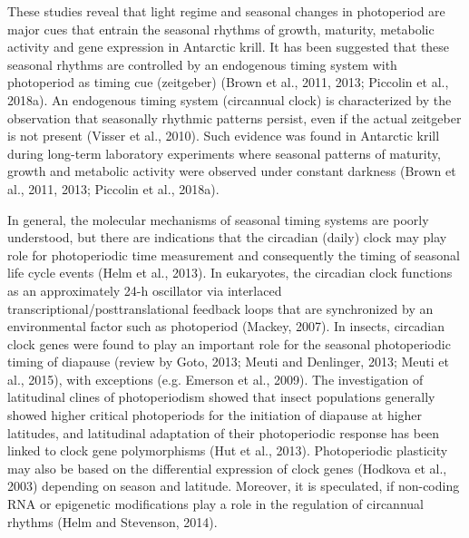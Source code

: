 These studies reveal that light regime and seasonal changes in photoperiod are
major cues that entrain the seasonal rhythms of growth, maturity, metabolic
activity and gene expression in Antarctic krill. It has been suggested that
these seasonal rhythms are controlled by an endogenous timing system with
photoperiod as timing cue (zeitgeber) (Brown et al., 2011, 2013; Piccolin et
al., 2018a). An endogenous timing system (circannual clock) is characterized by
the observation that seasonally rhythmic patterns persist, even if the actual
zeitgeber is not present (Visser et al., 2010). Such evidence was found in
Antarctic krill during long-term laboratory experiments where seasonal patterns
of maturity, growth and metabolic activity were observed under constant
darkness (Brown et al., 2011, 2013; Piccolin et al., 2018a).

In general, the molecular mechanisms of seasonal timing systems are poorly
understood, but there are indications that the circadian (daily) clock may play
role for photoperiodic time measurement and consequently the timing of seasonal
life cycle events (Helm et al., 2013). In eukaryotes, the circadian clock
functions as an approximately 24-h oscillator via interlaced
transcriptional/posttranslational feedback loops that are synchronized by an
environmental factor such as photoperiod (Mackey, 2007). In insects, circadian
clock genes were found to play an important role for the seasonal photoperiodic
timing of diapause (review by Goto, 2013; Meuti and Denlinger, 2013; Meuti et
al., 2015), with exceptions (e.g. Emerson et al., 2009). The investigation of
latitudinal clines of photoperiodism showed that insect populations generally
showed higher critical photoperiods for the initiation of diapause at higher
latitudes, and latitudinal adaptation of their photoperiodic response has been
linked to clock gene polymorphisms (Hut et al., 2013). Photoperiodic plasticity
may also be based on the differential expression of clock genes (Hodkova et
al., 2003) depending on season and latitude. Moreover, it is speculated, if
non-coding RNA or epigenetic modifications play a role in the regulation of
circannual rhythms (Helm and Stevenson, 2014).

